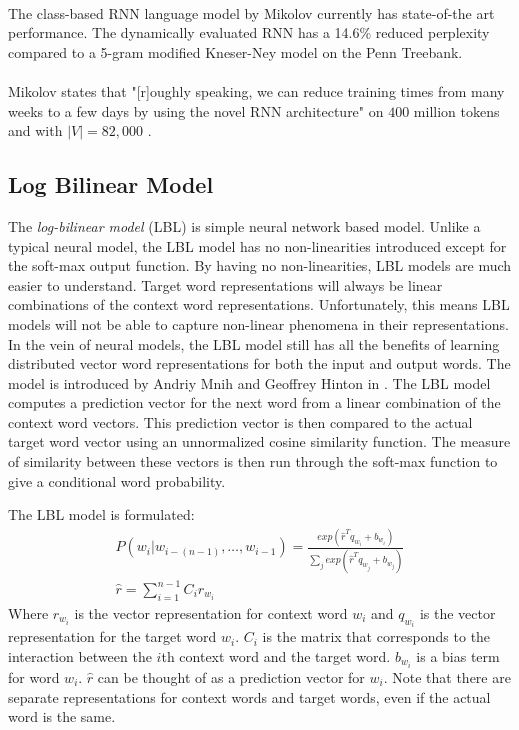 \paragraph{}
The class-based RNN language model by Mikolov \cite{Mikolov2012} currently has state-of-the art performance. The dynamically evaluated RNN has a 14.6\% reduced perplexity compared to a 5-gram modified Kneser-Ney model on the Penn Treebank.
\paragraph{}
Mikolov states that "[r]oughly speaking, we can reduce training times from many weeks to a few days by using the novel RNN architecture" on $400$ million tokens and with $|V|=82,000$ \cite[pg. 93]{Mikolov2012}. 

\subsection{Log Bilinear Model} \label{sec:lbl}
The \emph{log-bilinear model} (LBL) is simple neural network based model. Unlike a typical neural model, the LBL model has no non-linearities introduced except for the soft-max output function. By having no non-linearities, LBL models are much easier to understand. Target word representations will always be linear combinations of the context word representations. Unfortunately, this means LBL models will not be able to capture non-linear phenomena in their representations. In the vein of neural models,  the LBL model still has all the benefits of learning distributed vector word representations for both the input and output words. The model is introduced by Andriy Mnih and Geoffrey Hinton in \cite{MnihHinton2007}. The LBL model computes a prediction vector for the next word from a linear combination of the context word vectors. This prediction vector is then compared to the actual target word vector using an unnormalized cosine similarity function. The measure of similarity between these vectors is then run through the soft-max function to give a conditional word probability.

The LBL model is formulated:
\begin{align}
P(w_i | w_{i-(n-1)},\dots, w_{i-1})  = \frac{ exp( \hat{r}^T q_{w_i} +b_{w_i}) } { \sum_j exp( \hat{r}^T q_{w_j} +b_{w_j})} \label{eq:LBL}
\\ \hat{r} = \sum_{i=1}^{n-1} C_i r_{w_i}
\end{align}
Where $r_{w_i}$ is the vector representation for context word $w_i$ and $q_{w_i}$ is the vector representation for the target word $w_i$. $C_i$ is the matrix that corresponds to the interaction between the $i$th context word and the target word. $b_{w_i}$ is a bias term for word $w_i$. $\hat{r}$ can be thought of as a prediction vector for $w_i$. Note that there are separate representations for context words and target words, even if the actual word is the same.

